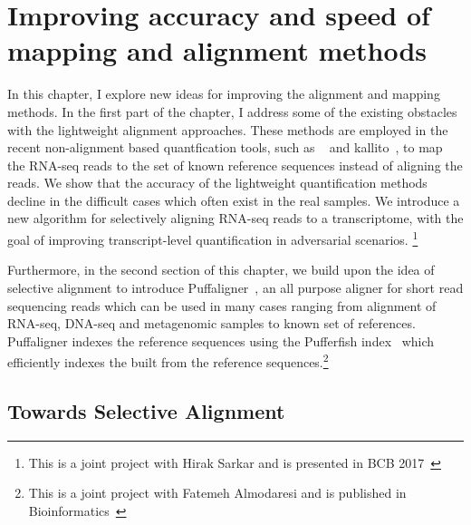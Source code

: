 
\renewcommand{\thechapter}{2}

\chapter[Alignment and mapping metods]
{Improving accuracy and speed of mapping and alignment methods}
\label{chapt2}

In this chapter, I explore new ideas for improving the alignment and mapping methods. 
In the first part of the chapter, I address some of the existing obstacles with the 
lightweight  alignment approaches. These methods are employed in the recent non-alignment 
based quantfication tools, such as \salmon~\citep{Patro2017Salmon} and 
kallito~\citep{Bray2016Kallisto}, to map the RNA-seq reads to the set of known reference 
sequences instead of aligning the reads. We show that the accuracy of the lightweight 
quantification methods decline in the difficult cases which often exist in the real 
samples. We introduce a new algorithm for selectively aligning RNA-seq reads to a 
transcriptome, with the goal of improving transcript-level quantification in adversarial 
scenarios.
\footnote{This is a joint project with Hirak Sarkar and is presented in BCB 2017~\citep{selaln}}

Furthermore, in the second section of this chapter, we build upon the idea of selective 
alignment to introduce Puffaligner~\citep{almodaresi2021puffaligner}, an all purpose 
aligner for short read sequencing reads which can be used in many cases ranging from 
alignment of RNA-seq, DNA-seq and metagenomic samples to known set of references. 
Puffaligner indexes the reference sequences using the Pufferfish index~\citep{pufferfish} 
which efficiently indexes the \ccdbg built from the reference sequences.\footnote{This is 
a joint project with Fatemeh Almodaresi and is published in 
Bioinformatics~\citep{almodaresi2021puffaligner}}


\section{Towards Selective Alignment}

